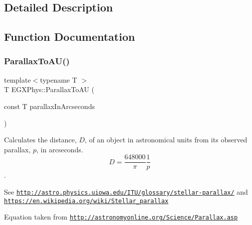 \subsection{Detailed Description}


\subsection{Function Documentation}
\mbox{\label{group___e_g_x_phys-_astrophysic-_parallax_ga2085f91170baba79a7fcc8a0ba77d1eb}} 
\subsubsection{\texorpdfstring{Parallax\+To\+A\+U()}{ParallaxToAU()}}
{\footnotesize\ttfamily template$<$typename T $>$ \\
T E\+G\+X\+Phys\+::\+Parallax\+To\+AU (\begin{DoxyParamCaption}\item[{const T}]{parallax\+In\+Arcseconds }\end{DoxyParamCaption})}



Calculates the distance, $D$, of an object in astronomical units from its observed parallax, $p$, in arcseconds. \[ D=\dfrac{648000}{\pi}\dfrac{1}{p}\]. 

See \href{http://astro.physics.uiowa.edu/ITU/glossary/stellar-parallax/}{\tt http\+://astro.\+physics.\+uiowa.\+edu/\+I\+T\+U/glossary/stellar-\/parallax/} and \href{https://en.wikipedia.org/wiki/Stellar_parallax}{\tt https\+://en.\+wikipedia.\+org/wiki/\+Stellar\+\_\+parallax}

Equation taken from \href{http://astronomyonline.org/Science/Parallax.asp}{\tt http\+://astronomyonline.\+org/\+Science/\+Parallax.\+asp}


